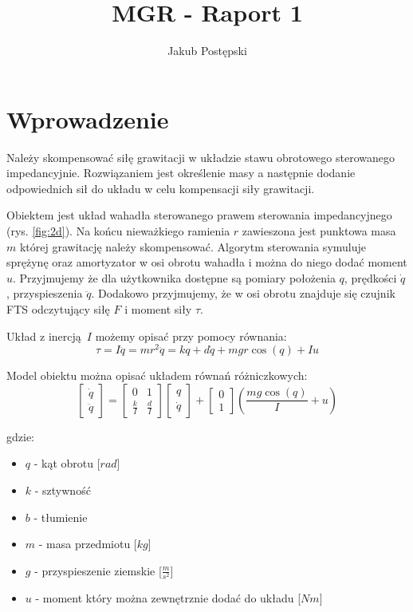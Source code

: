 \documentclass[a4paper, 10pt]{article}
\title{MGR - Raport 1}
\author{Jakub Postępski}
\begin{document}
\maketitle

\section{Wprowadzenie}
Należy skompensować siłę grawitacji w układzie stawu obrotowego sterowanego impedancyjnie. Rozwiązaniem jest określenie masy a następnie dodanie odpowiednich sił do układu w celu kompensacji siły grawitacji.

Obiektem jest układ wahadła sterowanego prawem sterowania impedancyjnego (rys. \ref{fig:2d}). Na końcu nieważkiego ramienia $r$ zawieszona jest punktowa masa $m$ której grawitację należy skompensować. Algorytm sterowania symuluje sprężynę oraz amortyzator w osi obrotu wahadła i można do niego dodać moment $u$.  Przyjmujemy że dla użytkownika dostępne są pomiary położenia $q$, prędkości $\dot{q}$, przyspieszenia $\ddot{q}$. Dodakowo przyjmujemy, że w osi obrotu znajduje się czujnik FTS odczytujący siłę $F$ i moment siły $\tau$.

Układ z inercją $I$ możemy opisać przy pomocy równania:
\begin{equation}
\label{eq:intro}
\tau = I\ddot{q} = mr^2\ddot{q} = kq + d\dot{q} + mgr\cos{(q)} + Iu
\end{equation}

Model obiektu można opisać układem równań różniczkowych:
\label{eq:intro2}
\begin{equation}
	\begin{bmatrix}
	    \dot{q} \\
	    \ddot{q}
	\end{bmatrix}
	=
	\begin{bmatrix}
	    0 & 1 \\
	    \frac{k}{I} & \frac{d}{I}
	\end{bmatrix}
	\begin{bmatrix}
		q \\
	    \dot{q}
	\end{bmatrix}
	+
	\begin{bmatrix}
	    0 \\
	    1
	\end{bmatrix}
	(\frac{mg\cos{(q)}}{I} + u)
\end{equation}

gdzie:
\begin{itemize}
	\item $q$ - kąt obrotu [$rad$]
	\item $k$ - sztywność
	\item $b$ - tłumienie
	\item $m$ - masa przedmiotu [$kg$]
	\item $g$ - przyspieszenie ziemskie [$\frac{m}{s^2}$]
	\item $u$ - moment który można zewnętrznie dodać do układu [$Nm$]
\end{itemize}
\end{document}
